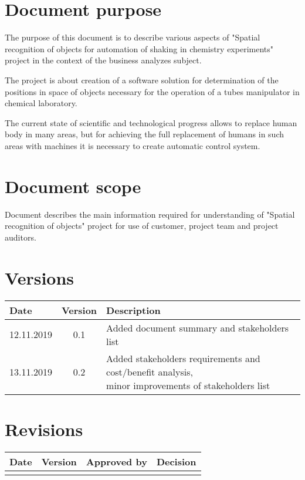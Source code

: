 \section{Document purpose} 

The purpose of this document is to describe various aspects of "Spatial recognition of objects
for automation of shaking in chemistry experiments" project in the context of the business analyzes subject.


The project is about creation of a software solution for determination of the positions
in space of objects necessary for the operation of a tubes manipulator in chemical laboratory.

The current state of scientific and technological progress allows to replace human body
in many areas, but for achieving the full replacement of humans in such areas with machines
it is necessary to create automatic control system.


\section{Document scope}

Document describes the main information required for understanding of "Spatial recognition of objects"
project for use of customer, project team and project auditors.


\section{Versions}


\begin{tabular}{ | l | c | l | }
	\hline
	Date & Version & Description \\ \hline
	12.11.2019 &  0.1 & Added document summary and stakeholders list \\ \hline
	13.11.2019 &  0.2 & \specialcell{Added stakeholders requirements and cost/benefit analysis,\\ minor improvements of stakeholders list} \\ \hline
\end{tabular}


\section{Revisions}

\begin{tabular}{ | l | c | c | l | }
	\hline
	Date & Version & Approved by & Decision \\ \hline
	& & & \\ \hline
\end{tabular}